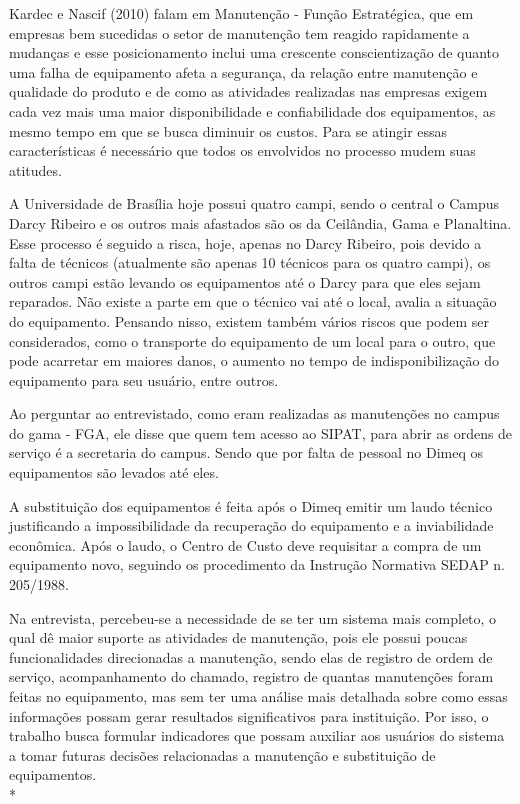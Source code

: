 Kardec e Nascif (2010) falam em Manutenção - Função Estratégica, que em empresas bem sucedidas o setor de manutenção tem reagido rapidamente a mudanças e esse posicionamento inclui uma crescente conscientização de quanto uma falha de equipamento afeta a segurança, da relação entre manutenção e qualidade do produto e de como as atividades realizadas nas empresas exigem cada vez mais uma maior disponibilidade e confiabilidade dos equipamentos, as mesmo tempo em que se busca diminuir os custos. Para se atingir essas características é necessário que todos os envolvidos no processo mudem suas atitudes. 

A Universidade de Brasília hoje possui quatro campi, sendo o central o Campus Darcy Ribeiro e os outros mais afastados são os da Ceilândia, Gama e Planaltina. Esse processo é seguido a risca, hoje, apenas no Darcy Ribeiro, pois devido a falta de técnicos (atualmente são apenas 10 técnicos para os quatro campi), os outros campi estão levando os equipamentos até o Darcy para que eles sejam reparados. Não existe a parte em que o técnico vai até o local, avalia a situação do equipamento. Pensando nisso, existem também vários riscos que podem ser considerados, como o transporte do equipamento de um local para o outro, que pode acarretar em maiores danos, o aumento no tempo de indisponibilização do equipamento para seu usuário, entre outros. 

Ao perguntar ao entrevistado, como eram realizadas as manutenções no campus do gama - FGA, ele disse que quem tem acesso ao SIPAT, para abrir as ordens de serviço é a secretaria do campus. Sendo que por falta de pessoal no Dimeq os equipamentos são levados até eles. 

A substituição dos equipamentos é feita após o Dimeq emitir um laudo técnico justificando a impossibilidade da recuperação do equipamento e a inviabilidade econômica. Após o laudo, o Centro de Custo deve requisitar a compra de um equipamento novo, seguindo os procedimento da Instrução Normativa SEDAP n. 205/1988.

Na entrevista, percebeu-se a necessidade de se ter um sistema mais completo, o qual dê maior suporte as atividades de manutenção, pois ele possui poucas funcionalidades direcionadas a manutenção, sendo elas de registro de ordem de serviço, acompanhamento do chamado, registro de quantas manutenções foram feitas no equipamento, mas sem ter uma análise mais detalhada sobre como essas informações possam gerar resultados significativos para instituição. Por isso, o trabalho busca formular indicadores que possam auxiliar aos usuários do sistema a tomar futuras decisões relacionadas a manutenção e substituição de equipamentos. \\*



